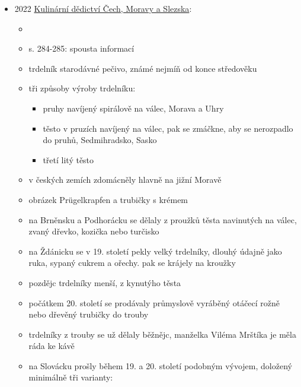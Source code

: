 \begin{itemize}
  \begin{itemize}
  \tightlist
  \item
    s. 38 recept na litej trdelník z roku 1891, kuchařka Die praktische
    Wiener Köchin, Anna Bauer
  \item
    s 103 trdelníky oblíbený masopustní pečivo u místních Němců a v
    Rakousku zvaný Prügelkrapfen, v moravských obcích trdláče nebo
    trdelníky. hotové se krájely na prstence zvané krůžalky
  \item
    s. 104 - smažený trubičky Rollkrapfen nebo Ringelkrapfen
  \item
    s. 138 trdelníky byly součástí svatebních dortů, jako svatební
    koruny - rozřezaný do prstenců. litej trdelník byl oblíbenej na
    svatbách Němců
  \end{itemize}
\item
  2022
  \href{https://kulturni-dejiny.slu.cz/data/uploads/067/upvysledky/067-2022-4-kulinarni_dedictvi_web_enc.pdf}{Kulinární
  dědictví Čech, Moravy a Slezska}:

  \begin{itemize}
  \tightlist
  \item
  \item
    s. 284-285: spousta informací
  \item
    trdelník starodávné pečivo, známé nejmíň od konce středověku
  \item
    tři způsoby výroby trdelníku:

    \begin{itemize}
    \tightlist
    \item
      pruhy navíjený spirálově na válec, Morava a Uhry
    \item
      těsto v pruzích navíjený na válec, pak se zmáčkne, aby se
      nerozpadlo do pruhů, Sedmihradsko, Sasko
    \item
      třetí litý těsto
    \end{itemize}
  \item
    v českých zemích zdomácněly hlavně na jižní Moravě
  \item
    obrázek Prügelkrapfen a trubičky s krémem
  \item
    na Brněnsku a Podhorácku se dělaly z proužků těsta navinutých na
    válec, zvaný dřevko, kozička nebo turčisko
  \item
    na Ždánicku se v 19. století pekly velký trdelníky, dlouhý údajně
    jako ruka, sypaný cukrem a ořechy. pak se krájely na kroužky
  \item
    pozdějc trdelníky menší, z kynutýho těsta
  \item
    počátkem 20. století se prodávaly průmyslově vyráběný otáčecí rožně
    nebo dřevěný trubičky do trouby
  \item
    trdelníky z trouby se už dělaly běžnějc, manželka Viléma Mrštíka je
    měla ráda ke kávě
  \item
    na Slovácku prošly během 19. a 20. století podobným vývojem,
    doložený minimálně tři varianty:


\end{itemize}
\end{itemize}
